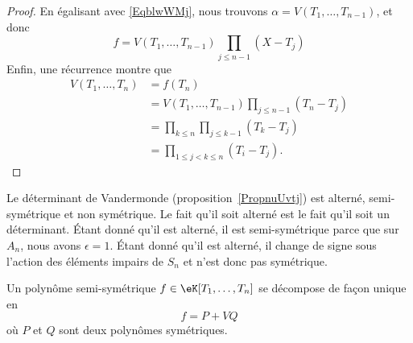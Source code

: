 \begin{proof}
	En égalisant avec \eqref{EqblwWMj}, nous trouvons \( \alpha=V(T_1,\ldots, T_{n-1})\), et donc
	\begin{equation}
		f=V(T_1,\ldots, T_{n-1})\prod_{j\leq n-1}(X-T_j)
	\end{equation}
	Enfin, une récurrence montre que
	\begin{subequations}
		\begin{align}
			V(T_1,\ldots, T_n) & =f(T_n)                                           \\
			                   & =V(T_1,\ldots, T_{n-1})\prod_{j\leq n-1}(T_n-T_j) \\
			                   & =\prod_{k\leq n}\prod_{j\leq k-1}(T_k-T_j)        \\
			                   & =\prod_{1\leq j<k\leq n}(T_i-T_j).
		\end{align}
	\end{subequations}
\end{proof}

\begin{example}
	Le déterminant de Vandermonde (proposition~\ref{PropnuUvtj}) est alterné, semi-symétrique et non symétrique. Le fait qu'il soit alterné est le fait qu'il soit un déterminant. Étant donné qu'il est alterné, il est semi-symétrique parce que sur \( A_n\), nous avons \( \epsilon=1\). Étant donné qu'il est alterné, il change de signe sous l'action des éléments impairs de \( S_n\) et n'est donc pas symétrique.
\end{example}

\begin{proposition} \label{PropUDqXax}
	Un polynôme semi-symétrique \( f\in \eK[T_1,\ldots, T_n]\) se décompose de façon unique en
	\begin{equation}
		f=P+VQ
	\end{equation}
	où \( P\) et \( Q\) sont deux polynômes symétriques.
\end{proposition}

